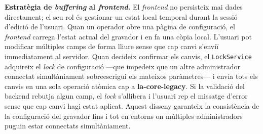 \textbf{Estratègia de \textit{buffering} al \textit{frontend}.} El \textit{frontend} no persisteix mai dades directament; el seu rol és gestionar un estat local temporal durant la sessió d'edició de l'usuari. Quan un operador obre una pàgina de configuració, el \textit{frontend} carrega l'estat actual del gravador i en fa una còpia local. L'usuari pot modificar múltiples camps de forma lliure sense que cap canvi s'enviï immediatament al servidor. Quan decideix confirmar els canvis, el \texttt{LockService} adquireix el \textit{lock} de configuració —que impedeix que un altre administrador connectat simultàniament sobreescrigui els mateixos paràmetres— i envia tots els canvis en una sola operació atòmica cap a \textbf{la-core-legacy}. Si la validació del backend rebutja algun camp, el \textit{lock} s'allibera i l'usuari rep el missatge d'error sense que cap canvi hagi estat aplicat. Aquest disseny garanteix la consistència de la configuració del gravador fins i tot en entorns on múltiples administradors puguin estar connectats simultàniament.